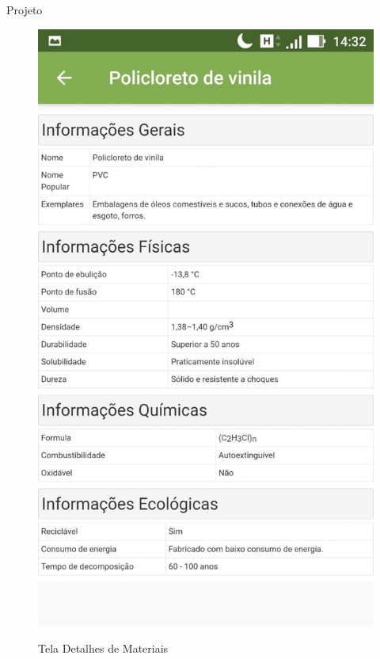 \documentclass[
	12pt,				%
	openany,			%
	twoside,			%
	a4paper,			%
	english,			%
	french,				%
	spanish,			%
	brazil				%
	]{abntex2}
\begin{document}
\begin{chapter}{Projeto}
\begin{figure}[htb]
\begin{minipage}{0.45\textwidth}
     \label{fig:tela_material__details_act_1}
  \end{minipage}
  \hfill
  \begin{minipage}{0.45\textwidth}
    \centering
    \caption{Tela Detalhes de Materiais}
    \includegraphics[scale=0.35]{media/tela_material__details_act_2.jpg}
     \label{fig:tela_material__details_act_2}
  \end{minipage}
\end{figure}


\end{chapter}
\end{document}
